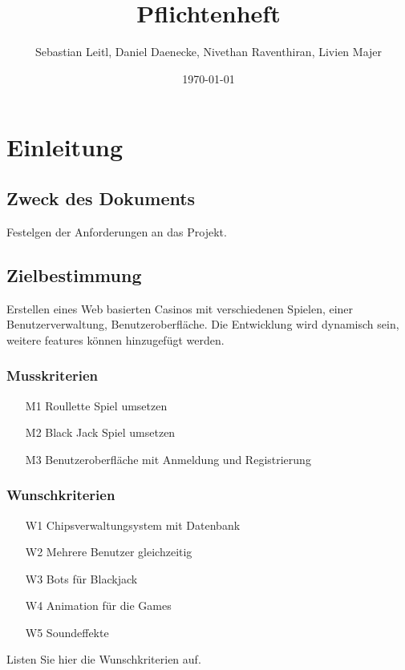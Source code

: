 \documentclass[a4paper,12pt]{article}
\title{Pflichtenheft}
\author{Sebastian Leitl, Daniel Daenecke, Nivethan Raventhiran, Livien Majer}
\date{\today}
\begin{document}
\maketitle

\tableofcontents

\section{Einleitung}
\subsection{Zweck des Dokuments}
Festelgen der Anforderungen an das Projekt. 

\subsection{Zielbestimmung}
Erstellen eines Web basierten Casinos mit verschiedenen Spielen, einer Benutzerverwaltung, Benutzeroberfläche. 
Die Entwicklung wird dynamisch sein, weitere features können hinzugefügt werden.
\subsubsection{Musskriterien}
\begin{itemize}
    \item[M1] Roullette Spiel umsetzen 
    \item[M2] Black Jack Spiel umsetzen
    \item[M3] Benutzeroberfläche mit Anmeldung und Registrierung   
\end{itemize}

\subsubsection{Wunschkriterien}
\begin{itemize}
    \item[W1] Chipsverwaltungsystem mit Datenbank 
    \item[W2] Mehrere Benutzer gleichzeitig
    \item[W3] Bots für Blackjack 
    \item[W4] Animation für die Games 
    \item[W5] Soundeffekte   
\end{itemize}    %
Listen Sie hier die Wunschkriterien auf.
\end{document}
